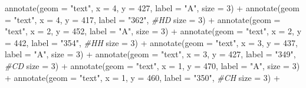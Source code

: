 \documentclass[
]{article}
\newenvironment{Shaded}{\begin{snugshade}}{\end{snugshade}}
\newcommand{\AttributeTok}[1]{\textcolor[rgb]{0.77,0.63,0.00}{#1}}
\newcommand{\CommentTok}[1]{\textcolor[rgb]{0.56,0.35,0.01}{\textit{#1}}}
\newcommand{\DecValTok}[1]{\textcolor[rgb]{0.00,0.00,0.81}{#1}}
\newcommand{\FunctionTok}[1]{\textcolor[rgb]{0.00,0.00,0.00}{#1}}
\newcommand{\NormalTok}[1]{#1}
\newcommand{\SpecialCharTok}[1]{\textcolor[rgb]{0.00,0.00,0.00}{#1}}
\newcommand{\StringTok}[1]{\textcolor[rgb]{0.31,0.60,0.02}{#1}}
\begin{document}
\begin{Shaded}
\begin{Highlighting}[]
  \FunctionTok{annotate}\NormalTok{(}\AttributeTok{geom =} \StringTok{"text"}\NormalTok{, }\AttributeTok{x =} \DecValTok{4}\NormalTok{, }\AttributeTok{y =} \DecValTok{427}\NormalTok{, }\AttributeTok{label =} \StringTok{"A"}\NormalTok{, }
           \AttributeTok{size =} \DecValTok{3}\NormalTok{) }\SpecialCharTok{+}
  \FunctionTok{annotate}\NormalTok{(}\AttributeTok{geom =} \StringTok{"text"}\NormalTok{, }\AttributeTok{x =} \DecValTok{4}\NormalTok{, }\AttributeTok{y =} \DecValTok{417}\NormalTok{, }\AttributeTok{label =} \StringTok{"362"}\NormalTok{, }\CommentTok{\#HD}
           \AttributeTok{size =} \DecValTok{3}\NormalTok{) }\SpecialCharTok{+}
  \FunctionTok{annotate}\NormalTok{(}\AttributeTok{geom =} \StringTok{"text"}\NormalTok{, }\AttributeTok{x =} \DecValTok{2}\NormalTok{, }\AttributeTok{y =} \DecValTok{452}\NormalTok{, }\AttributeTok{label =} \StringTok{"A"}\NormalTok{, }
           \AttributeTok{size =} \DecValTok{3}\NormalTok{) }\SpecialCharTok{+}
  \FunctionTok{annotate}\NormalTok{(}\AttributeTok{geom =} \StringTok{"text"}\NormalTok{, }\AttributeTok{x =} \DecValTok{2}\NormalTok{, }\AttributeTok{y =} \DecValTok{442}\NormalTok{, }\AttributeTok{label =} \StringTok{"354"}\NormalTok{, }\CommentTok{\#HH}
           \AttributeTok{size =} \DecValTok{3}\NormalTok{) }\SpecialCharTok{+}
  \FunctionTok{annotate}\NormalTok{(}\AttributeTok{geom =} \StringTok{"text"}\NormalTok{, }\AttributeTok{x =} \DecValTok{3}\NormalTok{, }\AttributeTok{y =} \DecValTok{437}\NormalTok{, }\AttributeTok{label =} \StringTok{"A"}\NormalTok{, }
           \AttributeTok{size =} \DecValTok{3}\NormalTok{) }\SpecialCharTok{+}
  \FunctionTok{annotate}\NormalTok{(}\AttributeTok{geom =} \StringTok{"text"}\NormalTok{, }\AttributeTok{x =} \DecValTok{3}\NormalTok{, }\AttributeTok{y =} \DecValTok{427}\NormalTok{, }\AttributeTok{label =} \StringTok{"349"}\NormalTok{, }\CommentTok{\#CD}
           \AttributeTok{size =} \DecValTok{3}\NormalTok{) }\SpecialCharTok{+}
  \FunctionTok{annotate}\NormalTok{(}\AttributeTok{geom =} \StringTok{"text"}\NormalTok{, }\AttributeTok{x =} \DecValTok{1}\NormalTok{, }\AttributeTok{y =} \DecValTok{470}\NormalTok{, }\AttributeTok{label =} \StringTok{"A"}\NormalTok{, }
           \AttributeTok{size =} \DecValTok{3}\NormalTok{) }\SpecialCharTok{+}
  \FunctionTok{annotate}\NormalTok{(}\AttributeTok{geom =} \StringTok{"text"}\NormalTok{, }\AttributeTok{x =} \DecValTok{1}\NormalTok{, }\AttributeTok{y =} \DecValTok{460}\NormalTok{, }\AttributeTok{label =} \StringTok{"350"}\NormalTok{, }\CommentTok{\#CH}
           \AttributeTok{size =} \DecValTok{3}\NormalTok{) }\SpecialCharTok{+}
  

\end{Highlighting}
\end{Shaded}
\end{document}
